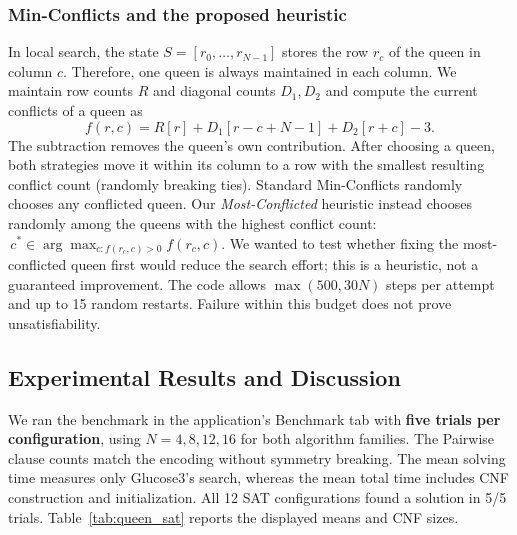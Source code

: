 \documentclass[conference]{IEEEtran}
\begin{document}
\subsubsection{Min-Conflicts and the proposed heuristic}
In local search, the state \(S=[r_0,\ldots,r_{N-1}]\) stores the row \(r_c\) of the queen in column \(c\). Therefore, one queen is always maintained in each column. We maintain row counts \(R\) and diagonal counts \(D_1,D_2\) and compute the current conflicts of a queen as
\begin{equation}
    f(r,c)=R[r]+D_1[r-c+N-1]+D_2[r+c]-3.
    \label{eq:queenconflicts}
\end{equation}
The subtraction removes the queen's own contribution. After choosing a queen, both strategies move it within its column to a row with the smallest resulting conflict count (randomly breaking ties). Standard Min-Conflicts randomly chooses any conflicted queen. Our \emph{Most-Conflicted} heuristic instead chooses randomly among the queens with the highest conflict count:
\(\,c^*\in\arg\max_{c:f(r_c,c)>0}f(r_c,c)\).
We wanted to test whether fixing the most-conflicted queen first would reduce the search effort; this is a heuristic, not a guaranteed improvement. The code allows \(\max(500,30N)\) steps per attempt and up to 15 random restarts. Failure within this budget does not prove unsatisfiability.

\subsection{Experimental Results and Discussion}
We ran the benchmark in the application's Benchmark tab with \textbf{five trials per configuration}, using \(N=4,8,12,16\) for both algorithm families. The Pairwise clause counts match the encoding without symmetry breaking. The mean solving time measures only Glucose3's search, whereas the mean total time includes CNF construction and initialization. All 12 SAT configurations found a solution in 5/5 trials. Table~\ref{tab:queen_sat} reports the displayed means and CNF sizes.
\end{document}
